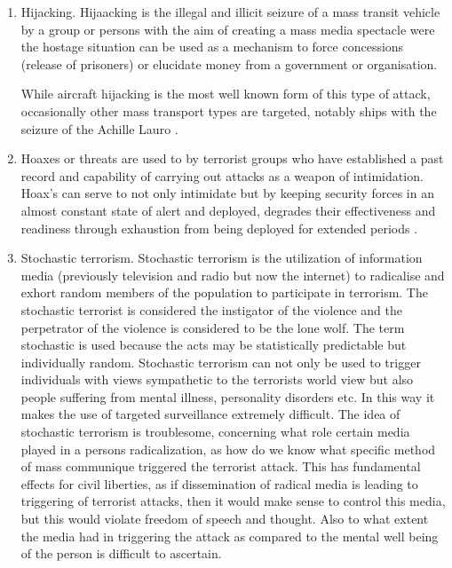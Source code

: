 \begin{enumerate}
\item Hijacking. Hijaacking is the illegal and illicit seizure of a mass transit vehicle by a group or persons with the aim of creating a mass media spectacle were the hostage situation can be used as a  mechanism to force concessions (release of prisoners) or elucidate money from a government or organisation. 

While aircraft hijacking is the most well known form of this type of attack, occasionally other mass transport types are targeted, notably ships with the seizure of the Achille Lauro \citep{halberstam1988terrorism}.

\item Hoaxes or threats are used to by terrorist groups who have established a past record and capability of carrying out attacks as a weapon of intimidation. Hoax's can serve to not only intimidate but by keeping security forces in an almost constant state of alert and deployed, degrades their effectiveness and readiness through exhaustion from being deployed for extended periods \citep{nagl2008us}.

\item Stochastic terrorism. Stochastic terrorism is the utilization of information media (previously television and radio but now the internet) to radicalise and exhort random members of the population to participate in terrorism. The stochastic terrorist is considered the instigator of the violence and the perpetrator of the violence is considered to be the lone wolf. The term stochastic is used because the acts may be statistically predictable but individually random. Stochastic terrorism can not only be used to trigger individuals with views sympathetic to the terrorists world view but also people suffering from mental illness, personality disorders etc. In this way it makes the use of targeted surveillance extremely difficult. The idea of stochastic terrorism is troublesome, concerning what role certain media played in a persons radicalization, as how do we know what specific method of mass communique triggered the terrorist attack. This has fundamental effects for civil liberties, as if dissemination of radical media is leading to triggering of terrorist attacks, then it would make sense to control this media, but this would violate freedom of speech and thought. Also to what extent the media had in triggering the attack as compared to the mental well being of the person is difficult to ascertain. 
\end{enumerate}

